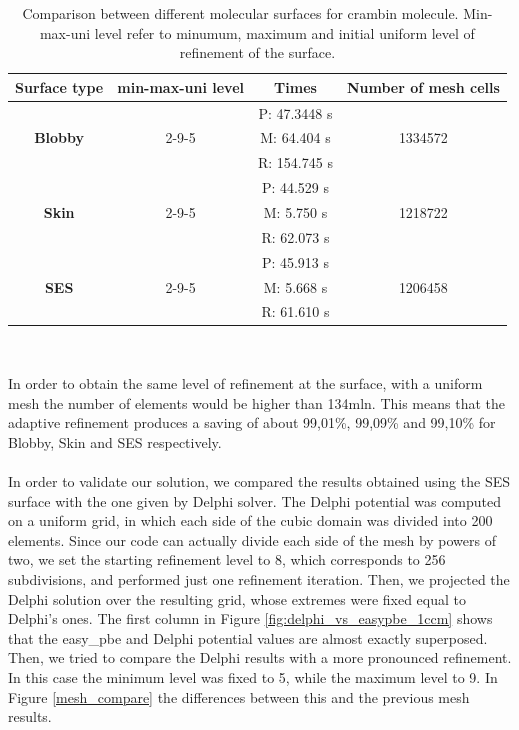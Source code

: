 \documentclass[11pt,a4paper]{article}
\begin{document}
\begin{table}[H]
    \centering 
    \begin{tabular}{| c | c | c | c |}
    \hline
    \rowcolor{bluePoli!40}
     Surface type & min-max-uni level & Times & Number of mesh cells \T\B \\
    \hline 
     & & P: 47.3448 s &  \T\B \\
    \textbf{Blobby} & 2-9-5 & M: 64.404 s & 1334572  \T\B \\
     &  &  R: 154.745 s &  \T\B \\
    \hline
     &   & P: 44.529 s &   \T\B\\
    \textbf{Skin} &  2-9-5 & M: 5.750 s & 1218722 \T\B\\
     &  & R: 62.073 s &   \T\B\\
    \hline
     &  & P: 45.913 s &   \T\B\\
    \textbf{SES} & 2-9-5 & M: 5.668 s & 1206458 \T\B\\
    & & R: 61.610 s &   \B\\
    \hline
    \end{tabular}
    \\[10pt]
    \caption{Comparison between different molecular surfaces for crambin molecule. Min-max-uni level refer to minumum, maximum and initial uniform level of refinement of the surface. }
    \label{table:1ccm}
\end{table}

In order to obtain the same level of refinement at the surface, with a uniform mesh the number of elements would be higher than 134mln. This means that the adaptive refinement produces a saving of about 99,01\%, 99,09\% and 99,10\% for Blobby, Skin and SES respectively. \\\\
In order to validate our solution, we compared the results obtained using the SES surface with the one given by Delphi solver. The Delphi potential was computed on a uniform grid, in which each side of the cubic domain was divided into 200 elements. Since our code can actually divide each side of the mesh by powers of two, we set the starting refinement level to 8, which corresponds to 256 subdivisions, and performed just one refinement iteration. Then, we projected the Delphi solution over the resulting grid, whose extremes were fixed equal to Delphi's ones. The first column in Figure \ref{fig:delphi_vs_easypbe_1ccm} shows that the easy\_pbe and Delphi potential values are almost exactly superposed. \\
Then, we tried to compare the Delphi results with a more pronounced refinement. In this case the minimum level was fixed to 5, while the maximum level to 9. In Figure \ref{mesh_compare} the differences between this and the previous mesh results.
\end{document}
